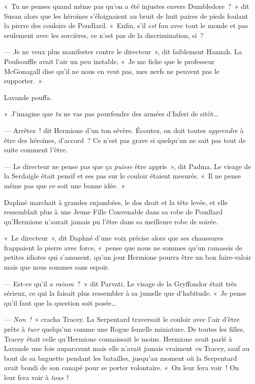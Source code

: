 «~Tu ne penses quand même pas qu'on a été injustes envers Dumbledore~?~»
dit Susan alors que les héroïnes s'éloignaient au bruit de huit paires de pieds foulant la pierre des couloirs de Poudlard.
«~Enfin, s'il \emph{est} fou avec tout le monde et pas seulement avec les sorcières, ce n'est pas de la discrimination, si~?

--- Je ne veux plus manifester contre le directeur~», dit faiblement Hannah.
La Poufsouffle avait l'air un peu instable.
«~Je me fiche que le professeur McGonagall dise qu'il ne nous en veut pas, mes nerfs ne peuvent pas le supporter.~»

Lavande pouffa.

«~J'imagine que \emph{tu} ne vas pas pourfendre des armées d'Inferi de sitôt…

--- Arrêtez~! dit Hermione d'un ton sévère.
Écoutez, on doit toutes \emph{apprendre} à être des héroïnes, d'accord~?
Ce n'est pas grave si quelqu'un ne sait pas tout de suite comment l'être.

--- Le directeur ne pense pas que ça \emph{puisse} être appris~», dit Padma.
Le visage de la Serdaigle était pensif et ses pas sur le couloir étaient mesurés.
«~Il ne pense même pas que ce soit une bonne idée.~»

Daphné marchait à grandes enjambées, le dos droit et la tête levée, et elle ressemblait plus à une Jeune Fille Convenable dans sa robe de Poudlard qu'Hermione n'aurait jamais pu l'être dans sa meilleure robe de soirée.

«~Le directeur~», dit Daphné d'une voix précise alors que ses chaussures frappaient la pierre avec force, «~pense que nous ne sommes qu'un ramassis de petites idiotes qui s'amusent, qu'un jour Hermione pourra être un bon faire-valoir mais que nous sommes sans espoir.

--- Est-ce qu'il a \emph{raison}~?~»
dit Parvati.
Le visage de la Gryffondor était très sérieux, ce qui la faisait plus ressembler à sa jumelle que d'habitude.
«~Je pense qu'il faut que la question soit posée…

--- \emph{Non~!}~» cracha Tracey.
La Serpentard traversait le couloir avec l'air d'être prête à \emph{tuer} quelqu'un comme une Rogue femelle miniature.
De toutes les filles, Tracey était celle qu'Hermione connaissait le moins.
Hermione avait parlé à Lavande une fois auparavant mais elle n'avait jamais vraiment \emph{vu} Tracey, sauf au bout de sa baguette pendant les batailles, jusqu'au moment où la Serpentard avait bondi de son canapé pour se porter volontaire.
«~On leur fera voir~!
On leur fera voir à \emph{tous}~!

